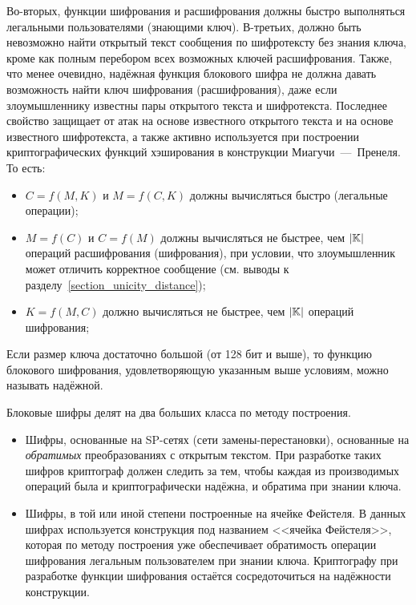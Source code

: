 Во-вторых, функции шифрования и расшифрования должны быстро выполняться легальными пользователями (знающими ключ). В-третьих,  должно быть невозможно найти открытый текст сообщения по шифротексту без знания ключа, кроме как полным перебором всех возможных ключей расшифрования. Также, что менее очевидно, надёжная функция блокового шифра не должна давать возможность найти ключ шифрования (расшифрования), даже если злоумышленнику известны пары открытого текста и шифротекста. Последнее свойство защищает от атак на основе известного открытого текста и на основе известного шифротекста, а также активно используется при построении криптографических функций хэширования в конструкции Миагучи~---~Пренеля. То есть:
\begin{itemize}
	\item $C = f \left( M, K \right)$ и $M = f \left( C, K \right)$ должны вычисляться быстро (легальные операции);
	\item $M = f \left( C \right)$ и $C = f \left( M \right)$ должны вычисляться не быстрее, чем $\left| \mathbb{K} \right|$ операций расшифрования (шифрования), при условии, что злоумышленник может отличить корректное сообщение (см. выводы к разделу~\ref{section_unicity_distance});
	\item $K = f \left( M, C \right)$ должно вычисляться не быстрее, чем $\left| \mathbb{K} \right|$ операций шифрования;
\end{itemize}

Если размер ключа достаточно большой (от 128 бит и выше), то функцию блокового шифрования, удовлетворяющую указанным выше условиям, можно называть надёжной.

Блоковые шифры делят на два больших класса по методу построения.
\begin{itemize}
	\item Шифры, основанные на SP-сетях (сети замены-перестановки), основанные на \textit{обратимых} преобразованиях с открытым текстом. При разработке таких шифров криптограф должен следить за тем, чтобы каждая из производимых операций была и криптографически надёжна, и обратима при знании ключа.
	\item Шифры, в той или иной степени построенные на ячейке Фейстеля. В данных шифрах используется конструкция под названием <<ячейка Фейстеля>>, которая по методу построения уже обеспечивает обратимость операции шифрования легальным пользователем при знании ключа. Криптографу при разработке функции шифрования остаётся сосредоточиться на надёжности конструкции.
\end{itemize}

